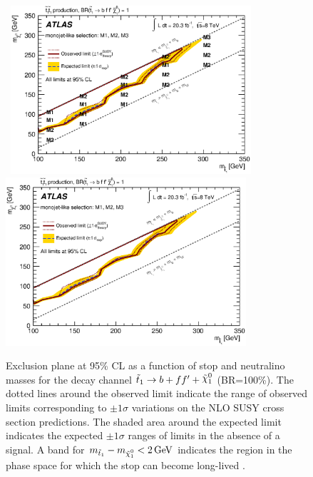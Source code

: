 \begin{figure}[!ht]
\begin{center}
\mbox{
\includegraphics[width=0.795\textwidth]{Interpretations/Figures/limitPlotFourBody_Stop_combined_M1_M2_M3_BestRegion.eps}
}
\mbox{
\includegraphics[width=0.795\textwidth]{Interpretations/Figures/limitPlotFourBody_Stop_combined_M1_M2_M3_.eps}
}
\end{center}
\caption[Exclusion plane at 95\% CL for stop pair production with $\stopfourbody$ as a function of the $m_{\stop}$ and $m_{\ninoone}$]{Exclusion plane at 95\% CL as a function of stop and neutralino masses for the decay channel $\stopfourbody$ (BR=100\%). The dotted lines around the observed limit indicate the range of observed limits corresponding to $\pm 1 \sigma$ variations on the NLO SUSY cross section predictions. The shaded area around the expected limit indicates the expected $\pm 1 \sigma$ ranges of limits in the absence of a signal. A band for $m_{\stopone} - m_{\ninoone}< \unit[2]{GeV}$ indicates the region in the phase space for which the stop can become long-lived \protect\cite{Aad:2014nra}.}
\label{fig:ExclusionStopToFourbody}
\end{figure}


